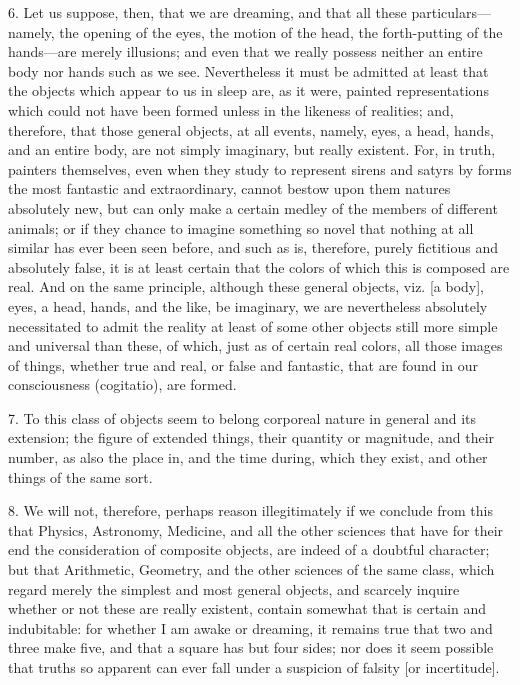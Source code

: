 6. Let us suppose, then, that we are dreaming, and that all these particulars—namely, the opening of the eyes, the motion of the head, the forth-putting of the hands—are merely illusions; and even that we really possess neither an entire body nor hands such as we see. Nevertheless it must be admitted at least that the objects which appear to us in sleep are, as it were, painted representations which could not have been formed unless in the likeness of realities; and, therefore, that those general objects, at all events, namely, eyes, a head, hands, and an entire body, are not simply imaginary, but really existent. For, in truth, painters themselves, even when they study to represent sirens and satyrs by forms the most fantastic and extraordinary, cannot bestow upon them natures absolutely new, but can only make a certain medley of the members of different animals; or if they chance to imagine something so novel that nothing at all similar has ever been seen before, and such as is, therefore, purely fictitious and absolutely false, it is at least certain that the colors of which this is composed are real. And on the same principle, although these general objects, viz. [a body], eyes, a head, hands, and the like, be imaginary, we are nevertheless absolutely necessitated to admit the reality at least of some other objects still more simple and universal than these, of which, just as of certain real colors, all those images of things, whether true and real, or false and fantastic, that are found in our consciousness (cogitatio), are formed.

7. To this class of objects seem to belong corporeal nature in general and its extension; the figure of extended things, their quantity or magnitude, and their number, as also the place in, and the time during, which they exist, and other things of the same sort.

8. We will not, therefore, perhaps reason illegitimately if we conclude from this that Physics, Astronomy, Medicine, and all the other sciences that have for their end the consideration of composite objects, are indeed of a doubtful character; but that Arithmetic, Geometry, and the other sciences of the same class, which regard merely the simplest and most general objects, and scarcely inquire whether or not these are really existent, contain somewhat that is certain and indubitable: for whether I am awake or dreaming, it remains true that two and three make five, and that a square has but four sides; nor does it seem possible that truths so apparent can ever fall under a suspicion of falsity [or incertitude].

